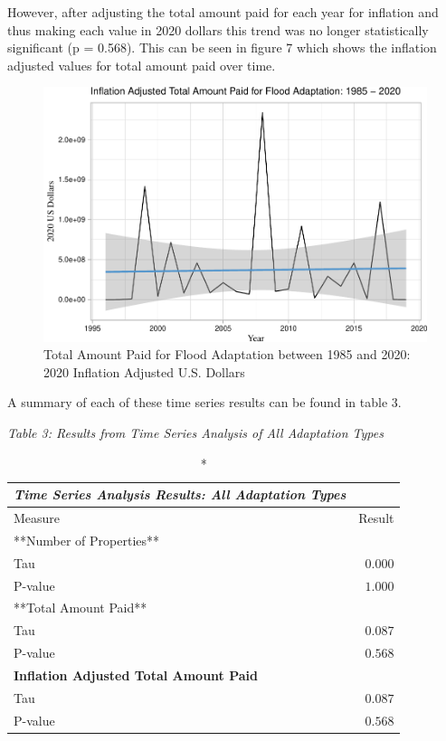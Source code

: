\documentclass[
  12pt,
]{article}
\begin{document}
However, after adjusting the total amount paid for each year for
inflation and thus making each value in 2020 dollars this trend was no
longer statistically significant (p = 0.568). This can be seen in figure
7 which shows the inflation adjusted values for total amount paid over
time.

\begin{figure}
\centering
\includegraphics{finalreport_files/figure-latex/unnamed-chunk-12-1.pdf}
\caption{Total Amount Paid for Flood Adaptation between 1985 and 2020:
2020 Inflation Adjusted U.S. Dollars}
\end{figure}

\newpage

A summary of each of these time series results can be found in table 3.

\emph{Table 3: Results from Time Series Analysis of All Adaptation
Types}\\
\captionsetup[table]{labelformat=empty,skip=1pt}

\begin{longtable}{lr}
\caption*{
{\large \emph{\textbf{Time Series Analysis Results: All Adaptation Types}}}
} \\ 
\toprule
Measure & Result \\ 
\midrule
\multicolumn{1}{l}{**Number of Properties**} \\ 
\midrule
Tau & $0.000$ \\ 
P-value & $1.000$ \\ 
\midrule
\multicolumn{1}{l}{**Total Amount Paid**} \\ 
\midrule
Tau & $0.087$ \\ 
P-value & $0.568$ \\ 
\midrule
\multicolumn{1}{l}{\textbf{Inflation Adjusted Total Amount Paid}} \\ 
\midrule
Tau & $0.087$ \\ 
P-value & $0.568$ \\ 
\bottomrule
\end{longtable}
\end{document}
